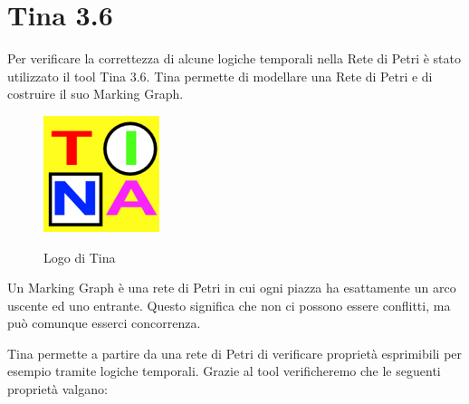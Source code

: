 \section{Tina 3.6}
Per verificare la correttezza di alcune logiche temporali nella Rete di Petri è stato utilizzato il tool Tina 3.6.\newline
Tina permette di modellare una Rete di Petri e di costruire il suo Marking Graph.
\begin{figure}[H]
	\begin{center}
		\includegraphics[width=0.2\linewidth]{img/tina.png}
		\label{fig:tina}
		\caption{Logo di Tina}
	\end{center}
\end{figure}
\begin{info}[INFO:]
Un Marking Graph è una rete di Petri in cui ogni piazza ha esattamente un arco uscente ed uno entrante. Questo significa che non ci possono essere conflitti, ma può comunque esserci concorrenza.
\end{info}
Tina permette a partire da una rete di Petri di verificare proprietà esprimibili per esempio tramite logiche temporali.
\newline
Grazie al tool verificheremo che le seguenti proprietà valgano:
